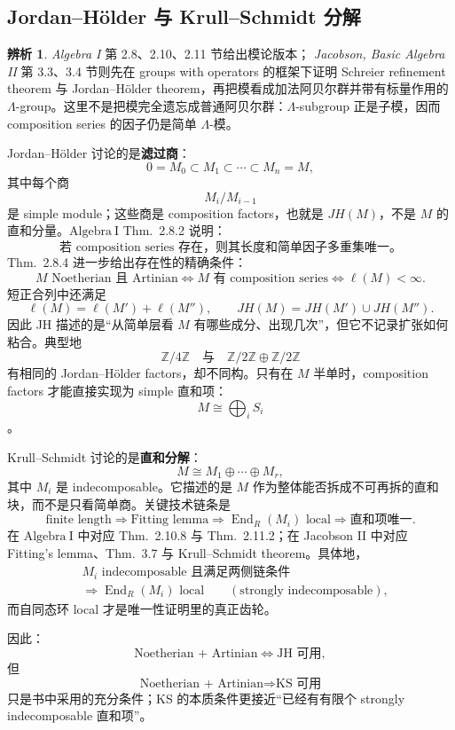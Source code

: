 \documentclass[a4paper]{ctexart}
\theoremstyle{definition}
\theoremstyle{analysis}
\newtheorem{remark}{辨析}[section]
\theoremstyle{plain}
\begin{document}
\subsection{Jordan--Hölder 与 Krull--Schmidt 分解}\label{subsec:jh-ks-decomposition}

\begin{remark}
\label{rem:jh-vs-ks}
\textit{Algebra I} 第 2.8、2.10、2.11 节给出模论版本；
\textit{Jacobson, Basic Algebra II} 第 3.3、3.4 节则先在 groups with operators 的框架下证明
Schreier refinement theorem 与 Jordan--Hölder theorem，再把模看成加法阿贝尔群并带有标量作用的
\(\Lambda\)-group。这里不是把模完全遗忘成普通阿贝尔群：\(\Lambda\)-subgroup 正是子模，因而 composition series 的因子仍是简单 \(\Lambda\)-模。

Jordan--Hölder 讨论的是\textbf{滤过商}：
\[
  0=M_0\subset M_1\subset\cdots\subset M_n=M,
\]
其中每个商
\[
  M_i/M_{i-1}
\]
是 simple module；这些商是 composition factors，也就是 \(JH(M)\)，不是 \(M\) 的直和分量。\(\mathrm{Algebra\ I}\) Thm.~2.8.2 说明：
\[
  \text{若 composition series 存在，则其长度和简单因子多重集唯一。}
\]
Thm.~2.8.4 进一步给出存在性的精确条件：
\[
  M\text{ Noetherian 且 Artinian}
  \Longleftrightarrow
  M\text{ 有 composition series}
  \Longleftrightarrow
  \ell(M)<\infty .
\]
短正合列中还满足
\[
  \ell(M)=\ell(M')+\ell(M''),
  \qquad
  JH(M)=JH(M')\cup JH(M'').
\]
因此 JH 描述的是“从简单层看 \(M\) 有哪些成分、出现几次”，但它不记录扩张如何粘合。典型地
\[
  \mathbb Z/4\mathbb Z
  \quad\text{与}\quad
  \mathbb Z/2\mathbb Z\oplus \mathbb Z/2\mathbb Z
\]
有相同的 Jordan--Hölder factors，却不同构。只有在 \(M\) 半单时，composition factors 才能直接实现为 simple 直和项：
\[
  M\cong \bigoplus_i S_i
\]
。

Krull--Schmidt 讨论的是\textbf{直和分解}：
\[
  M\cong M_1\oplus\cdots\oplus M_r,
\]
其中 \(M_i\) 是 indecomposable。它描述的是 \(M\) 作为整体能否拆成不可再拆的直和块，而不是只看简单商。关键技术链条是
\[
  \text{finite length}
  \Longrightarrow
  \text{Fitting lemma}
  \Longrightarrow
  \operatorname{End}_R(M_i)\text{ local}
  \Longrightarrow
  \text{直和项唯一}.
\]
在 \(\mathrm{Algebra\ I}\) 中对应 Thm.~2.10.8 与 Thm.~2.11.2；在 Jacobson II 中对应 Fitting's lemma、Thm.~3.7 与 Krull--Schmidt theorem。具体地，
\[
\begin{aligned}
  &M_i\text{ indecomposable 且满足两侧链条件}\\
  &\Longrightarrow
  \operatorname{End}_R(M_i)\text{ local}
  \qquad(\text{strongly indecomposable}),
\end{aligned}
\]
而自同态环 local 才是唯一性证明里的真正齿轮。

因此：
\[
  \text{Noetherian + Artinian}
  \iff
  \text{JH 可用},
\]
但
\[
  \text{Noetherian + Artinian}
  \Longrightarrow
  \text{KS 可用}
\]
只是书中采用的充分条件；KS 的本质条件更接近“已经有有限个 strongly indecomposable 直和项”。
\end{remark}
\end{document}
